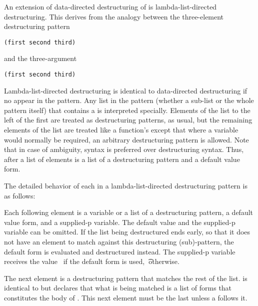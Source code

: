 
An extension of data-directed destructuring of  is
lambda-list-directed destructuring.  This derives from the analogy
between the three-element destructuring pattern
 
{\tt 	(first second third)}
 
and the three-argument 
 
{\tt	(first second third)}
 

Lambda-list-directed destructuring is identical to data-directed destructuring
if no  appear in the pattern.  
Any list in the pattern (whether a sub-list or the whole pattern itself)
that contains a  is interpreted specially.
Elements of the list to the left of the first
 are treated as destructuring patterns, as usual, but the
remaining elements of the list are treated like a function's 
except that where a variable would normally be required, an arbitrary
destructuring pattern is allowed.  Note that in case of ambiguity,
 syntax is preferred over destructuring syntax.  Thus, after
 a list of elements is a list of a destructuring pattern
and a default value form.
 
The detailed behavior of each  in a 
lambda-list-directed destructuring
pattern is as follows:

\beginlist
{}

Each following element is a variable or a list of a destructuring
pattern, a default value form, and a supplied-p variable.  The default value and
the supplied-p variable can be omitted.  
If the list being destructured ends
early, so that it does not have an element to match against this destructuring
(sub)-pattern, the default form is evaluated and destructured instead.  The
supplied-p variable receives the value 
\nil\ if the default form is used, \t\ otherwise.
 

The next element is a destructuring pattern that matches the
rest of the list.   is identical to  but declares that what
is being matched is a list of forms that constitutes the body of .
This next element must be the last unless a  follows it.
 
